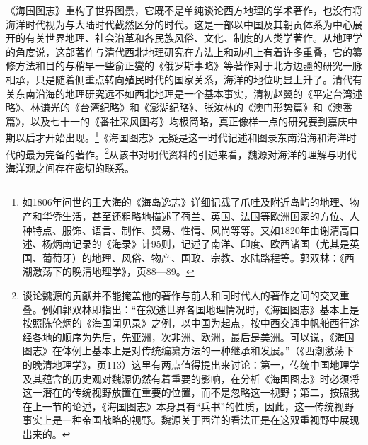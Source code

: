 \documentclass[a4paper, 12pt, openright]{ctexbook}
\begin{document}
《海国图志》重构了世界图景，它既不是单纯谈论西方地理的学术著作，也没有将海洋时代视为与大陆时代截然区分的时代。这是一部以中国及其朝贡体系为中心展开的有关世界地理、社会沿革和各民族风俗、文化、制度的人类学著作。从地理学的角度说，这部著作与清代西北地理研究在方法上和动机上有着许多重叠，它的纂修方法和目的与稍早一些俞正燮的《俄罗斯事略》等著作对于北方边疆的研究一脉相承，只是随着侧重点转向殖民时代的国家关系，海洋的地位明显上升了。清代有关东南沿海的地理研究远不如西北地理是一个基本事实，清初赵翼的《平定台湾述略》、林谦光的《台湾纪略》和《澎湖纪略》、张汝林的《澳门形势篇》和《澳番篇》，以及七十一的《番社采风图考》均极简略，真正像样一点的研究要到嘉庆中期以后才开始出现。\footnote{如1806年问世的王大海的《海岛逸志》详细记载了爪哇及附近岛屿的地理、物产和华侨生活，甚至还粗略地描述了荷兰、英国、法国等欧洲国家的方位、人种特点、服饰、语言、制作、贸易、性情、风尚等等。又如1820年由谢清高口述、杨炳南记录的《海录》计95则，记述了南洋、印度、欧西诸国（尤其是英国、葡萄牙）的地理、风俗、物产、国政、宗教、水陆路程等。郭双林：《西潮激荡下的晚清地理学》，页88—89。}《海国图志》无疑是这一时代记述和图录东南沿海和海洋时代的最为完备的著作。\footnote{谈论魏源的贡献并不能掩盖他的著作与前人和同时代人的著作之间的交叉重叠。例如郭双林即指出：“在叙述世界各国地理情况时，《海国图志》基本上是按照陈伦炳的《海国闻见录》之例，以中国为起点，按中西交通中帆船西行途经各地的顺序为先后，先亚洲，次非洲、欧洲，最后是美洲。可以说，《海国图志》在体例上基本上是对传统编纂方法的一种继承和发展。”（《西潮激荡下的晚清地理学》，页113）这里有两点值得提出来讨论：第一，传统中国地理学及其蕴含的历史观对魏源仍然有着重要的影响，在分析《海国图志》时必须将这一潜在的传统视野放置在重要的位置，而不是忽略这一视野；第二，按照我在上一节的论述，《海国图志》本身具有“兵书”的性质，因此，这一传统视野事实上是一种帝国战略的视野。魏源关于西洋的看法正是在这双重视野中展现出来的。}从该书对明代资料的引述来看，魏源对海洋的理解与明代海洋观之间存在密切的联系。
\end{document}
